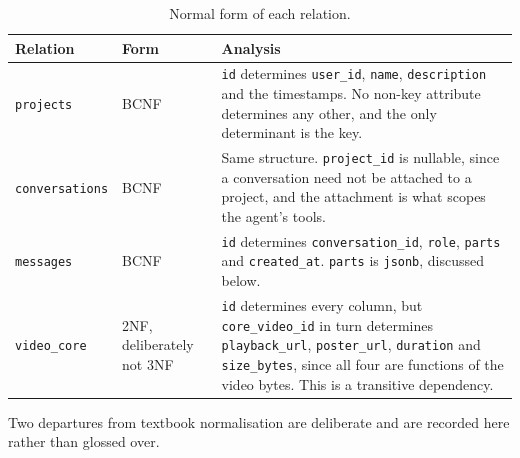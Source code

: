 \documentclass[11pt,a4paper]{article}
\begin{document}
\begin{table}[htbp]
\centering
\small
\begin{tabularx}{\textwidth}{@{}L{2.3cm}L{1.4cm}X@{}}
\toprule
\textbf{Relation} & \textbf{Form} & \textbf{Analysis} \\
\midrule
\texttt{projects} & BCNF & \texttt{id} determines \texttt{user\_id},
\texttt{name}, \texttt{description} and the timestamps. No non-key attribute
determines any other, and the only determinant is the key. \\
\texttt{conversations} & BCNF & Same structure. \texttt{project\_id} is
nullable, since a conversation need not be attached to a project, and the
attachment is what scopes the agent's tools. \\
\texttt{messages} & BCNF & \texttt{id} determines
\texttt{conversation\_id}, \texttt{role}, \texttt{parts} and
\texttt{created\_at}. \texttt{parts} is \texttt{jsonb}, discussed below. \\
\texttt{video\_core} & 2NF, deliberately not 3NF & \texttt{id} determines every
column, but \texttt{core\_video\_id} in turn determines \texttt{playback\_url},
\texttt{poster\_url}, \texttt{duration} and \texttt{size\_bytes}, since all four
are functions of the video bytes. This is a transitive dependency. \\
\bottomrule
\end{tabularx}
\caption{Normal form of each relation.}
\end{table}

Two departures from textbook normalisation are deliberate and are recorded here
rather than glossed over.
\end{document}
